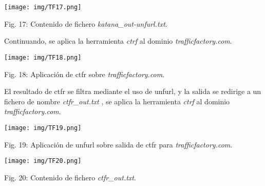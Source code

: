 \documentclass[12pt,oneside,a4paper]{book}
\begin{document}
\begin{center}
	\texttt{[image: img/TF17.png]}
    
\vspace{0.1em}
    
    Fig. 17: Contenido de fichero \textit{katana\_out-unfurl.txt}.
\end{center}

\vspace{2em}

\hspace{20pt}
Continuando, se aplica la herramienta \textit{ctrf} al dominio \textit{trafficfactory.com}.

\vspace{2em}

\begin{center}
	\texttt{[image: img/TF18.png]}
    
\vspace{0.1em}

    Fig. 18: Aplicación de ctfr sobre \textit{trafficfactory.com}.
\end{center}

\vspace{2em}

\hspace{20pt}
El resultado de ctfr se filtra mediante el uso de unfurl, y la salida se redirige a un fichero de nombre \textit{ctfr\_out.txt} , se aplica la herramienta \textit{ctrf} al dominio \textit{trafficfactory.com}.

\vspace{2em}

\begin{center}
	\texttt{[image: img/TF19.png]}
    
\vspace{0.1em}
    
    Fig. 19: Aplicación de unfurl sobre salida de ctfr para \textit{trafficfactory.com}.
\end{center}

\vspace{2em}

\begin{center}
	\texttt{[image: img/TF20.png]}
    
\vspace{0.1em}
    
    Fig. 20: Contenido de fichero \textit{ctfr\_out.txt}.
\end{center}

\vspace{2em}
\end{document}
